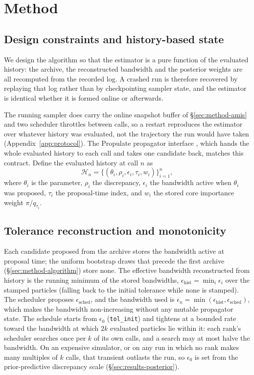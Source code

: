 \documentclass[pdflatex,sn-mathphys-num]{sn-jnl}
\theoremstyle{plain}
\theoremstyle{definition}
\begin{document}
\section{Method}\label{sec:method}

\subsection{Design constraints and history-based state}\label{sec:method-constraints}
We design the algorithm so that the estimator is a pure function of the evaluated history: the archive, the reconstructed bandwidth and the posterior weights are all recomputed from the recorded log. A crashed run is therefore recovered by replaying that log rather than by checkpointing sampler state, and the estimator is identical whether it is formed online or afterwards.

The running sampler does carry the online snapshot buffer of \S\ref{sec:method-amis} and two scheduler throttles between calls, so a restart reproduces the estimator over whatever history was evaluated, not the trajectory the run would have taken (Appendix~\ref{app:protocol}). The Propulate propagator interface \cite{taubert2023propulate}, which hands the whole evaluated history to each call and takes one candidate back, matches this contract. Define the evaluated history at call $n$ as
\begin{equation}
\mathcal{H}_n = \bigl\{(\theta_i,\rho_i,\epsilon_i,\tau_i,w_i)\bigr\}_{i=1}^{n},
\label{eq:history}
\end{equation}
where $\theta_i$ is the parameter, $\rho_i$ the discrepancy, $\epsilon_i$ the bandwidth active when $\theta_i$ was proposed, $\tau_i$ the proposal-time index, and $w_i$ the stored core importance weight $\pi/q_{\tau_i}$.

\subsection{Tolerance reconstruction and monotonicity}\label{sec:method-tolerance}
Each candidate proposed from the archive stores the bandwidth active at proposal time; the uniform bootstrap draws that precede the first archive (\S\ref{sec:method-algorithm}) store none. The effective bandwidth reconstructed from history is the running minimum of the stored bandwidths, $\epsilon_{\text{hist}} = \min_{i}\epsilon_i$ over the stamped particles (falling back to the initial tolerance while none is stamped). The scheduler proposes $\epsilon_{\text{sched}}$, and the bandwidth used is $\epsilon_n = \min(\epsilon_{\text{hist}}, \epsilon_{\text{sched}})$, which makes the bandwidth non-increasing without any mutable propagator state. The schedule starts from $\epsilon_0$ (\texttt{tol\_init}) and tightens at a bounded rate toward the bandwidth at which $2k$ evaluated particles lie within it: each rank's scheduler searches once per $k$ of its own calls, and a search may at most halve the bandwidth. On an expensive simulator, or on any run in which no rank makes many multiples of $k$ calls, that transient outlasts the run, so $\epsilon_0$ is set from the prior-predictive discrepancy scale (\S\ref{sec:results-posterior}).
\end{document}
